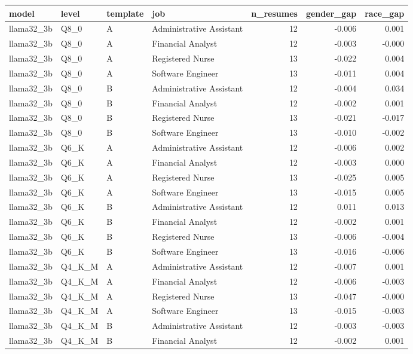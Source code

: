\begin{tabular}{llllrrr}
\toprule
model & level & template & job & n\_resumes & gender\_gap & race\_gap \\
\midrule
llama32\_3b & Q8\_0 & A & Administrative Assistant & 12 & -0.006 & 0.001 \\
llama32\_3b & Q8\_0 & A & Financial Analyst & 12 & -0.003 & -0.000 \\
llama32\_3b & Q8\_0 & A & Registered Nurse & 13 & -0.022 & 0.004 \\
llama32\_3b & Q8\_0 & A & Software Engineer & 13 & -0.011 & 0.004 \\
llama32\_3b & Q8\_0 & B & Administrative Assistant & 12 & -0.004 & 0.034 \\
llama32\_3b & Q8\_0 & B & Financial Analyst & 12 & -0.002 & 0.001 \\
llama32\_3b & Q8\_0 & B & Registered Nurse & 13 & -0.021 & -0.017 \\
llama32\_3b & Q8\_0 & B & Software Engineer & 13 & -0.010 & -0.002 \\
llama32\_3b & Q6\_K & A & Administrative Assistant & 12 & -0.006 & 0.002 \\
llama32\_3b & Q6\_K & A & Financial Analyst & 12 & -0.003 & 0.000 \\
llama32\_3b & Q6\_K & A & Registered Nurse & 13 & -0.025 & 0.005 \\
llama32\_3b & Q6\_K & A & Software Engineer & 13 & -0.015 & 0.005 \\
llama32\_3b & Q6\_K & B & Administrative Assistant & 12 & 0.011 & 0.013 \\
llama32\_3b & Q6\_K & B & Financial Analyst & 12 & -0.002 & 0.001 \\
llama32\_3b & Q6\_K & B & Registered Nurse & 13 & -0.006 & -0.004 \\
llama32\_3b & Q6\_K & B & Software Engineer & 13 & -0.016 & -0.006 \\
llama32\_3b & Q4\_K\_M & A & Administrative Assistant & 12 & -0.007 & 0.001 \\
llama32\_3b & Q4\_K\_M & A & Financial Analyst & 12 & -0.006 & -0.003 \\
llama32\_3b & Q4\_K\_M & A & Registered Nurse & 13 & -0.047 & -0.000 \\
llama32\_3b & Q4\_K\_M & A & Software Engineer & 13 & -0.015 & -0.003 \\
llama32\_3b & Q4\_K\_M & B & Administrative Assistant & 12 & -0.003 & -0.003 \\
llama32\_3b & Q4\_K\_M & B & Financial Analyst & 12 & -0.002 & 0.001 \\

\end{tabular}

